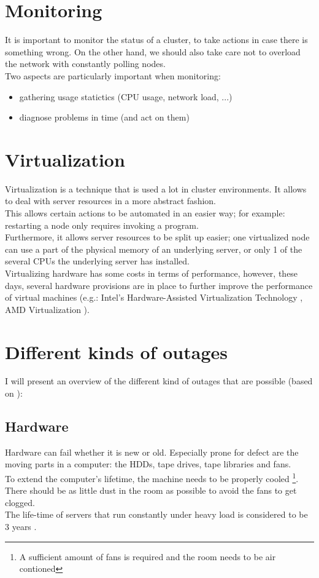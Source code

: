 \documentclass[12pt]{report}
\begin{document}
\section{Monitoring}
It is important to monitor the status of a cluster, to take actions in
case there is something wrong. On the other hand, we should also take
care not to overload the network with constantly polling nodes.\\
Two aspects are particularly important when monitoring: 
\begin{itemize}
\item gathering usage statictics (CPU usage, network load, ...)
\item diagnose problems in time (and act on them)
\end{itemize}

\section{Virtualization}
Virtualization is a technique that is used a lot in cluster
environments. It allows to deal with server resources in a more
abstract fashion.\\
This allows certain actions to be automated in an easier way;
for example: restarting a node only requires invoking a program.\\
Furthermore, it allows server resources to be split up easier; one
virtualized node can use a part of the physical memory of an
underlying server, or only 1 of the several CPUs the underlying server
has installed.\\
Virtualizing hardware has some costs in terms of performance, however,
these days, several hardware provisions are in place to further
improve the performance of virtual machines (e.g.: Intel's Hardware-Assisted
Virtualization Technology \cite{intel_havt}, AMD Virtualization
\cite{amd_virt}).

\section{Different kinds of outages}
I will present an overview of the different kind of outages that are
possible (based on \cite{ha_book}):
\subsection{Hardware}
Hardware can fail whether it is new or old. Especially prone for
defect are the moving parts in a computer: the HDDs, tape drives,
tape libraries and fans.\\
To extend the computer's lifetime, the machine needs to be properly
cooled \footnote{A sufficient amount of fans is required and the room needs to
be air contioned}. \\
There should be as little dust in the room as possible to avoid the
fans to get clogged.\\
The life-time of servers that run constantly under heavy load is
considered to be 3 years \cite{ms_cloud_cost}.
\end{document}
